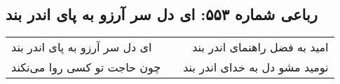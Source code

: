 \begin{center}
\section*{رباعی شماره ۵۵۳: ای دل سر آرزو به پای اندر بند}
\label{sec:0553}
\begin{longtable}{l p{0.5cm} r}
ای دل سر آرزو به پای اندر بند
&&
امید به فضل راهنمای اندر بند
\\
چون حاجت تو کسی روا می‌نکند
&&
نومید مشو دل به خدای اندر بند
\\
\end{longtable}
\end{center}
